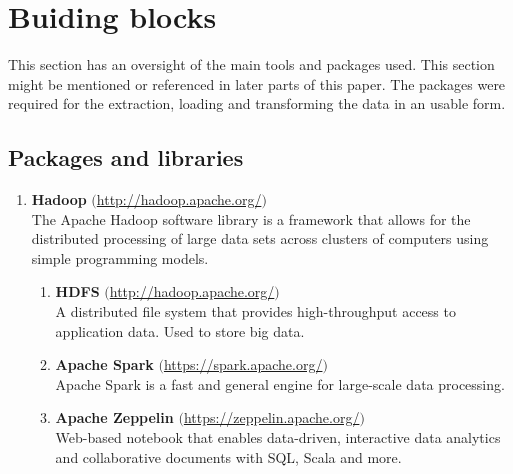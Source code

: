 \section{Buiding blocks} \label{theory:buildingblocks}
This section has an oversight of the main tools and packages used. This section might be mentioned or referenced in later parts of this paper. The packages were required for the extraction, loading and transforming the data in an usable form.

\subsection{Packages and libraries}

\begin{enumerate}
    \item \textbf{Hadoop} $($\url{http://hadoop.apache.org/}$)$ \\
    The Apache Hadoop software library is a framework that allows for the distributed processing of large data sets across clusters of computers using simple programming models. 
    \begin{enumerate}
        \item \textbf{HDFS} $($\url{http://hadoop.apache.org/}$)$ \\
        A distributed file system that provides high-throughput access to application data. Used to store big data.
        \item \textbf{Apache Spark} $($\url{https://spark.apache.org/}$)$\\
        Apache Spark is a fast and general engine for large-scale data processing.
        \item \textbf{Apache Zeppelin} $($\url{https://zeppelin.apache.org/}$)$ \\
         Web-based notebook that enables data-driven, interactive data analytics and collaborative documents with SQL, Scala and more.
    \end{enumerate}
    

\end{enumerate}
